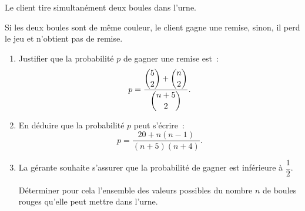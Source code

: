 \documentclass[10pt]{article}
\begin{document}
Le client tire simultanément deux boules dans l'urne.

Si les deux boules sont de même couleur, le client gagne une remise, sinon, il perd le jeu et n'obtient pas de remise.

\begin{enumerate}
\item Justifier que la probabilité $p$ de gagner une remise est~:
\[
p = \dfrac{\dbinom{5}{2} + \dbinom{n}{2}}{\dbinom{n+5}{2}}.
\]
\item En déduire que la probabilité $p$ peut s'écrire~:
\[
p = \dfrac{20 + n(n-1)}{(n+5)(n+4)}.
\]
\item La gérante souhaite s'assurer que la probabilité de gagner est inférieure à $\dfrac{1}{2}$.

Déterminer pour cela l'ensemble des valeurs possibles du nombre $n$ de boules rouges qu'elle peut mettre dans l'urne.
\end{enumerate}

\bigskip
\end{document}
